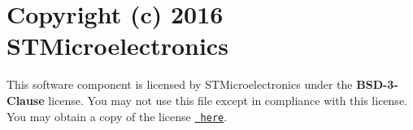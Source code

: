 \chapter{Copyright (c) 2016 STMicroelectronics}
\hypertarget{md_swont__ide_2_drivers_2_s_t_m32_f4xx___h_a_l___driver_2_license}{}\label{md_swont__ide_2_drivers_2_s_t_m32_f4xx___h_a_l___driver_2_license}
\label{md_swont__ide_2_drivers_2_s_t_m32_f4xx___h_a_l___driver_2_license_autotoc_md1}%
%
 This software component is licensed by STMicroelectronics under the {\bfseries{BSD-\/3-\/\+Clause}} license. You may not use this file except in compliance with this license. You may obtain a copy of the license \href{https://opensource.org/licenses/BSD-3-Clause}{\texttt{ here}}. 